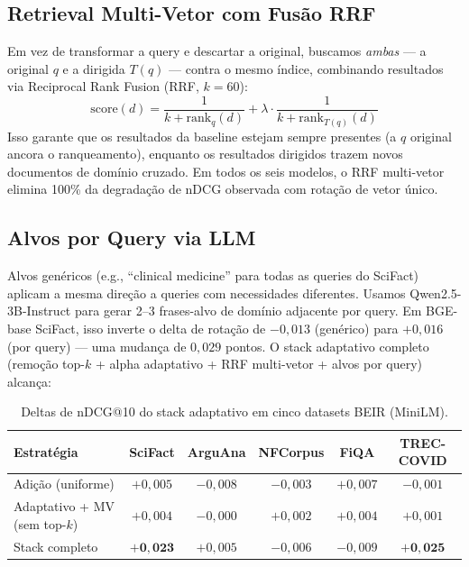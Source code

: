 \documentclass{article}
\begin{document}
\subsection{Retrieval Multi-Vetor com Fusão RRF}

Em vez de transformar a query e descartar a original, buscamos \emph{ambas} --- a original $q$ e a dirigida $T(q)$ --- contra o mesmo índice, combinando resultados via Reciprocal Rank Fusion (RRF, $k=60$):
\begin{equation}
\text{score}(d) = \frac{1}{k + \text{rank}_q(d)} + \lambda \cdot \frac{1}{k + \text{rank}_{T(q)}(d)}
\end{equation}
Isso garante que os resultados da baseline estejam sempre presentes (a $q$ original ancora o ranqueamento), enquanto os resultados dirigidos trazem novos documentos de domínio cruzado. Em todos os seis modelos, o RRF multi-vetor elimina 100\% da degradação de nDCG observada com rotação de vetor único.

\subsection{Alvos por Query via LLM}

Alvos genéricos (e.g., ``clinical medicine'' para todas as queries do SciFact) aplicam a mesma direção a queries com necessidades diferentes. Usamos Qwen2.5-3B-Instruct para gerar 2--3 frases-alvo de domínio adjacente por query. Em BGE-base SciFact, isso inverte o delta de rotação de $-0{,}013$ (genérico) para $+0{,}016$ (por query) --- uma mudança de $0{,}029$ pontos. O stack adaptativo completo (remoção top-$k$ + alpha adaptativo + RRF multi-vetor + alvos por query) alcança:

\begin{table}[h]
\centering
\caption{Deltas de nDCG@10 do stack adaptativo em cinco datasets BEIR (MiniLM).}
\begin{tabular}{lccccc}
\toprule
Estratégia & SciFact & ArguAna & NFCorpus & FiQA & TREC-COVID \\
\midrule
Adição (uniforme) & $+0{,}005$ & $-0{,}008$ & $-0{,}003$ & $+0{,}007$ & $-0{,}001$ \\
Adaptativo + MV (sem top-$k$) & $+0{,}004$ & $-0{,}000$ & $+0{,}002$ & $+0{,}004$ & $+0{,}001$ \\
Stack completo & $\mathbf{+0{,}023}$ & $+0{,}005$ & $-0{,}006$ & $-0{,}009$ & $\mathbf{+0{,}025}$ \\
\bottomrule
\end{tabular}
\end{table}
\end{document}
